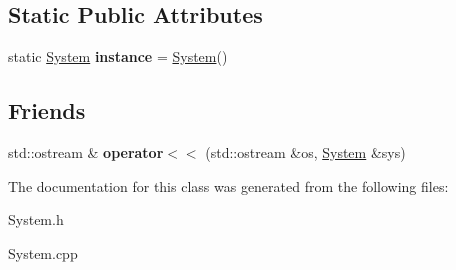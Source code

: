 \subsection*{Static Public Attributes}
\begin{DoxyCompactItemize}
\item 
\mbox{\label{classSystem_a40d348884d1b737ecd26b4bc6509bf48}} 
static \mbox{\hyperlink{classSystem}{System}} {\bfseries instance} = \mbox{\hyperlink{classSystem}{System}}()
\end{DoxyCompactItemize}
\subsection*{Friends}
\begin{DoxyCompactItemize}
\item 
\mbox{\label{classSystem_a1efa95132e95a7a6b11c3b54916d66ae}} 
std\+::ostream \& {\bfseries operator$<$$<$} (std\+::ostream \&os, \mbox{\hyperlink{classSystem}{System}} \&sys)
\end{DoxyCompactItemize}


The documentation for this class was generated from the following files\+:\begin{DoxyCompactItemize}
\item 
System.\+h\item 
System.\+cpp\end{DoxyCompactItemize}
